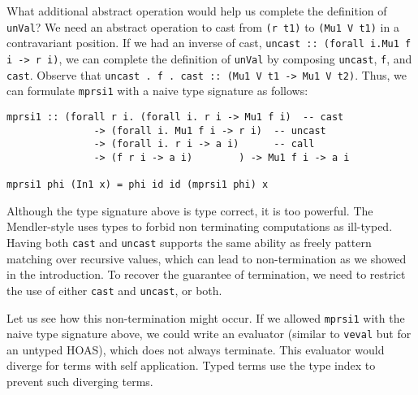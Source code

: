 What additional abstract operation would help us complete
the definition of \lstinline{unVal}? We need an abstract operation
to cast from \lstinline{(r t1)} to \lstinline{(Mu1 V t1)}
in a contravariant position. If we had an inverse of cast,
\lstinline{uncast :: (forall i.Mu1 f i -> r i)}, we can
complete the definition of \lstinline{unVal} by composing
\lstinline{uncast}, \lstinline{f}, and \lstinline{cast}.
Observe that \lstinline{uncast . f . cast :: (Mu1 V t1 -> Mu1 V t2)}.
Thus, we can formulate \lstinline{mprsi1} with a naive type signature
as follows:
\begin{lstlisting}
mprsi1 :: (forall r i. (forall i. r i -> Mu1 f i)  -- cast
               -> (forall i. Mu1 f i -> r i)  -- uncast
               -> (forall i. r i -> a i)      -- call
               -> (f r i -> a i)        ) -> Mu1 f i -> a i

mprsi1 phi (In1 x) = phi id id (mprsi1 phi) x
\end{lstlisting}
Although the type signature above is type correct, it is too powerful.
The Mendler-style uses types to forbid non terminating computations
as ill-typed. Having both \lstinline{cast} and \lstinline{uncast} supports
the same ability as freely pattern matching over recursive values,
which can lead to non-termination as we showed in the introduction.
To recover the guarantee of termination, we need to restrict the use of
either \lstinline{cast} and \lstinline{uncast}, or both.

Let us see how this non-termination might occur. If we allowed
\lstinline{mprsi1} with the naive type signature above, we could write
an evaluator (similar to \lstinline{veval} but for an untyped HOAS),
which does not always terminate. This evaluator would diverge for terms
with self application. Typed terms use the type index to prevent
such diverging terms.

